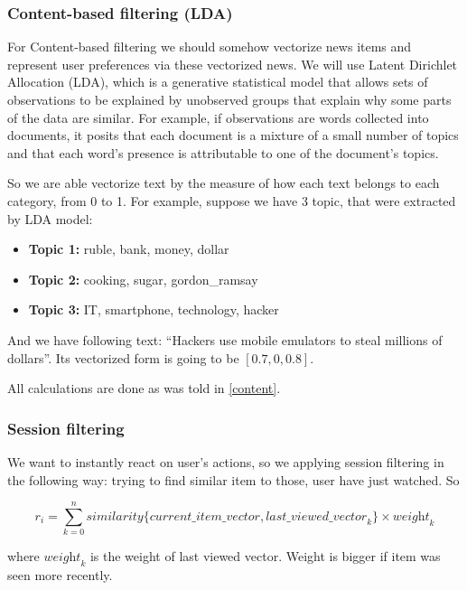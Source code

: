 \documentclass{article}
\begin{document}
\subsubsection{Content-based filtering (LDA)}

For Content-based filtering we should somehow vectorize news items and represent user preferences via these vectorized news. We will use Latent Dirichlet Allocation (LDA), which is a generative statistical model that allows sets of observations to be explained by unobserved groups that explain why some parts of the data are similar. For example, if observations are words collected into documents, it posits that each document is a mixture of a small number of topics and that each word's presence is attributable to one of the document's topics.

So we are able vectorize text by the measure of how each text belongs to each category, from 0 to 1.
For example, suppose we have 3 topic, that were extracted by LDA model:

\begin{itemize}
    \item \textbf{Topic 1:} ruble, bank, money, dollar
    \item \textbf{Topic 2:} cooking, sugar, gordon\_ramsay
    \item \textbf{Topic 3:} IT, smartphone, technology, hacker
\end{itemize}

And we have following text: ``Hackers use mobile emulators to steal millions of dollars''. Its vectorized form is going to be $[0.7, 0, 0.8]$.

All calculations are done as was told in \ref{content}.


\subsubsection{Session filtering}

We want to instantly react on user's actions, so we applying session filtering in the following way:
trying to find similar item to those, user have just watched. So 

$$r_{i}=\sum_{k=0}^{n} \textit{similarity}\{\textit{current\_item\_vector}, \textit{last\_viewed\_vector}_{k}\} \times \textit{weight}_k$$

where $\textit{weight}_k$ is the weight of last viewed vector. Weight is bigger if item was seen more recently.



\end{document}
